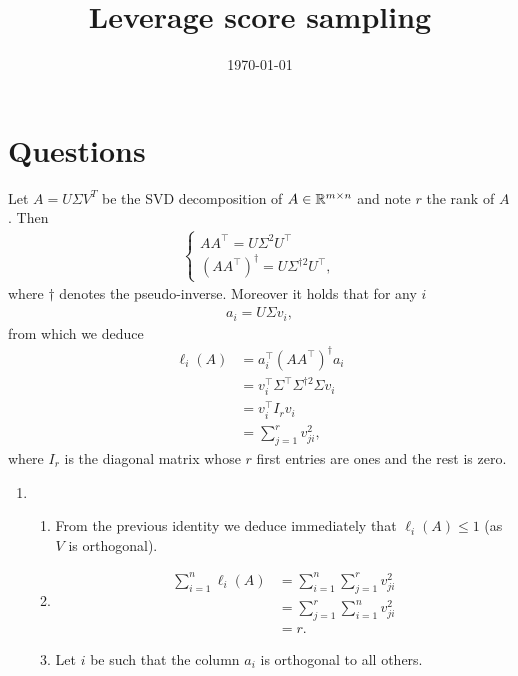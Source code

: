\documentclass{article}
\title{Leverage score sampling}
\date{\today}
\begin{document}
\maketitle

\section{Questions}
\label{sec:questions}

Let $A = U \Sigma V^T$ be the SVD decomposition of $A \in {\mathbb R}^{m \times n}$
and note $r$ the rank of $A$.
Then
\begin{align*}
  \begin{cases}
    AA^\top = U \Sigma^2 U^\top\\
    (AA^\top)^\dagger = U \Sigma^{\dagger 2} U^\top,
  \end{cases}
\end{align*}
where $\dagger$ denotes the pseudo-inverse.
Moreover it holds that for any $i$
\begin{align*}
  a_i = U \Sigma v_i,
\end{align*}
from which we deduce
\begin{align*}
  \ell_i(A) &= a_i^\top (A A^\top)^\dagger a_i\\
            &= v_i^\top \Sigma^\top \Sigma^{\dagger 2} \Sigma v_i\\
            &= v_i^\top I_r v_i\\
            &= \sum_{j = 1}^r v_{ji}^2,
\end{align*}
where $I_r$ is the diagonal matrix whose $r$ first entries are ones and the rest
is zero.

\begin{enumerate}
\item \begin{enumerate}[label=\alph*)]
  \item From the previous identity we deduce immediately that $\ell_i(A) \leq 1$
    (as $V$ is orthogonal).
  \item
    \begin{align*}
      \sum_{i = 1}^n \ell_i(A) &= \sum_{i = 1}^n \sum_{j = 1}^r v_{ji}^2\\
                               &= \sum_{j = 1}^r \sum_{i = 1}^n v_{ji}^2\\
                               &= r.
    \end{align*}
  \item Let $i$ be such that the column $a_i$ is orthogonal to all others.
  \end{enumerate}
\end{enumerate}



\end{document}
